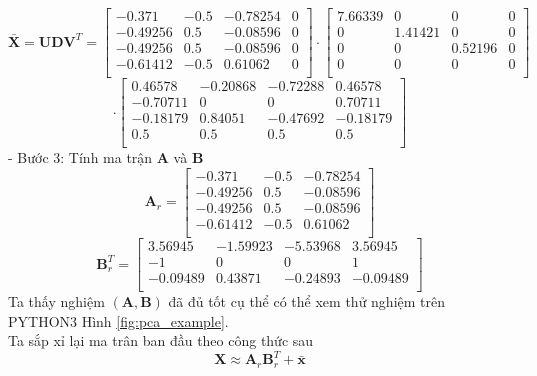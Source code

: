 \documentclass[14pt,oneside,a4paper]{report}
\numberwithin{equation}{section}
\begin{document}
\[
\bar{\mathbf{X}}=\mathbf{UDV}^{T} = \begin{bmatrix}
-0.371 & -0.5 & -0.78254 & 0 \\
-0.49256 & 0.5 & -0.08596 & 0 \\
-0.49256 & 0.5 & -0.08596 & 0 \\
-0.61412 & -0.5 & 0.61062 & 0 \\
\end{bmatrix} \cdot \begin{bmatrix}
7.66339 & 0 & 0 & 0 \\
0 & 1.41421 & 0 & 0 \\
0 & 0 & 0.52196 & 0 \\
0 & 0 & 0 & 0 \\
\end{bmatrix}
\]
\[
\cdot \begin{bmatrix}
0.46578 & -0.20868 & -0.72288 & 0.46578 \\
-0.70711 & 0 & 0 & 0.70711 \\
-0.18179 & 0.84051 & -0.47692 & -0.18179 \\
0.5 & 0.5 & 0.5 & 0.5 \\
\end{bmatrix}
\]
- Bước 3: Tính ma trận $\mathbf{A}$ và $\mathbf{B}$
\begin{equation}
\mathbf{A}_r = \begin{bmatrix}
	-0.371 & -0.5 & -0.78254  \\
	-0.49256 & 0.5 & -0.08596 \\
	-0.49256 & 0.5 & -0.08596  \\
	-0.61412 & -0.5 & 0.61062 \\
\end{bmatrix}
\end{equation}
\begin{equation}
\mathbf{B}_r^{T} =\begin{bmatrix}
	3.56945 & -1.59923 & -5.53968 & 3.56945 \\
	-1 & 0 & 0 & 1 \\
	-0.09489 & 0.43871 & -0.24893 & -0.09489 \\
\end{bmatrix}
\end{equation}
Ta thấy nghiệm $(\mathbf{A, B})$ đã đủ tốt cụ thể có thể xem thử nghiệm trên PYTHON3 Hình \ref{fig:pca_example}.\\
Ta sắp xỉ lại ma trân ban đầu theo công thức sau 
\begin{equation} 
\mathbf{X} \approx \mathbf{A}_r\mathbf{B}_r^{T}+ \bar{\mathbf{x}} 
\end{equation} 
\end{document}
